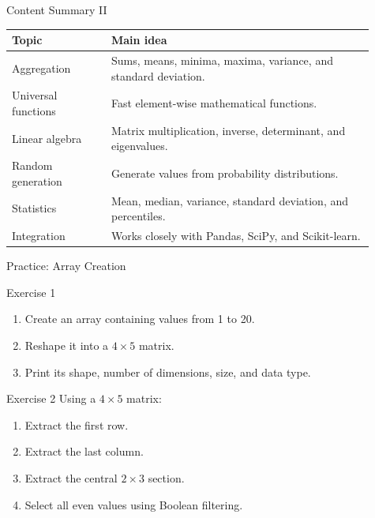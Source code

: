\documentclass[aspectratio=169,11pt]{beamer}
\begin{document}
\begin{frame}{Content Summary II}
\small
\begin{tabular}{p{0.25\linewidth}p{0.66\linewidth}}
\toprule
\textbf{Topic} & \textbf{Main idea} \\
\midrule
Aggregation & Sums, means, minima, maxima, variance, and standard deviation. \\
Universal functions & Fast element-wise mathematical functions. \\
Linear algebra & Matrix multiplication, inverse, determinant, and eigenvalues. \\
Random generation & Generate values from probability distributions. \\
Statistics & Mean, median, variance, standard deviation, and percentiles. \\
Integration & Works closely with Pandas, SciPy, and Scikit-learn. \\
\bottomrule
\end{tabular}
\end{frame}

\begin{frame}{Practice: Array Creation}
\small
\begin{block}{Exercise 1}
\begin{enumerate}
  \item Create an array containing values from 1 to 20.
  \item Reshape it into a \(4 \times 5\) matrix.
  \item Print its shape, number of dimensions, size, and data type.
\end{enumerate}
\end{block}
\begin{block}{Exercise 2}
Using a \(4 \times 5\) matrix:
\begin{enumerate}
  \item Extract the first row.
  \item Extract the last column.
  \item Extract the central \(2 \times 3\) section.
  \item Select all even values using Boolean filtering.
\end{enumerate}
\end{block}
\end{frame}
\end{document}
